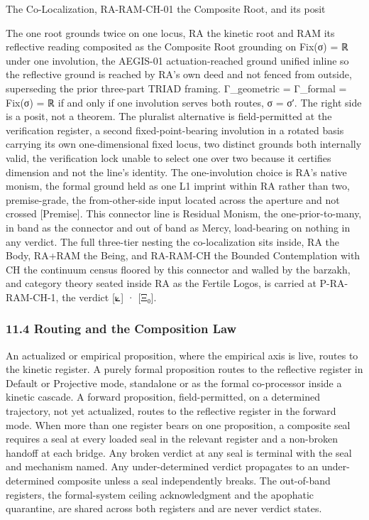 \documentclass[10pt,twocolumn]{article}
\begin{document}
\begin{jbox}{The Co-Localization, RA-RAM-CH-01 the Composite Root, and its posit}

The one root grounds twice on one locus, RA the kinetic root and RAM its
reflective reading composited as the Composite Root grounding on Fix(σ)
= ℝ under one involution, the AEGIS-01 actuation-reached ground unified
inline so the reflective ground is reached by RA's own deed and not
fenced from outside, superseding the prior three-part TRIAD framing.
Γ\_geometric = Γ\_formal = Fix(σ) = ℝ if and only if one involution
serves both routes, σ = σ′. The right side is a posit, not a theorem.
The pluralist alternative is field-permitted at the verification
register, a second fixed-point-bearing involution in a rotated basis
carrying its own one-dimensional fixed locus, two distinct grounds both
internally valid, the verification lock unable to select one over two
because it certifies dimension and not the line's identity. The
one-involution choice is RA's native monism, the formal ground held as
one L1 imprint within RA rather than two, premise-grade, the
from-other-side input located across the aperture and not crossed
{[}Premise{]}. This connector line is Residual Monism, the
one-prior-to-many, in band as the connector and out of band as Mercy,
load-bearing on nothing in any verdict. The full three-tier nesting the
co-localization sits inside, RA the Body, RA+RAM the Being, and
RA-RAM-CH the Bounded Contemplation with CH the continuum census floored
by this connector and walled by the barzakh, and category theory seated
inside RA as the Fertile Logos, is carried at P-RA-RAM-CH-1, the verdict
{[}⟀{]} · {[}Ξ₀{]}.

\end{jbox}

\hypertarget{routing-and-the-composition-law}{%
\subsubsection{11.4 Routing and the Composition
Law}\label{routing-and-the-composition-law}}

An actualized or empirical proposition, where the empirical axis is
live, routes to the kinetic register. A purely formal proposition routes
to the reflective register in Default or Projective mode, standalone or
as the formal co-processor inside a kinetic cascade. A forward
proposition, field-permitted, on a determined trajectory, not yet
actualized, routes to the reflective register in the forward mode. When
more than one register bears on one proposition, a composite seal
requires a seal at every loaded seal in the relevant register and a
non-broken handoff at each bridge. Any broken verdict at any seal is
terminal with the seal and mechanism named. Any under-determined verdict
propagates to an under-determined composite unless a seal independently
breaks. The out-of-band registers, the formal-system ceiling
acknowledgment and the apophatic quarantine, are shared across both
registers and are never verdict states.
\end{document}
